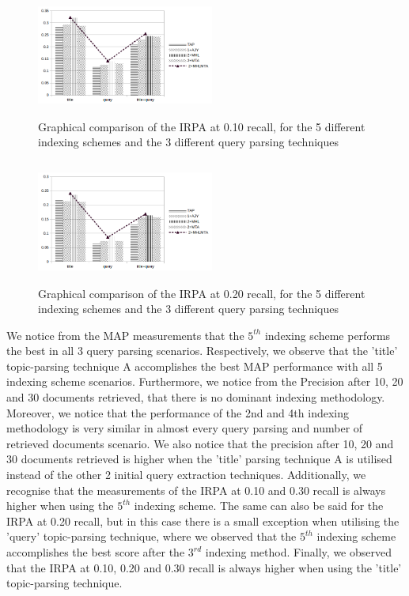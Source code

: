 \vspace{-0.5cm}
\begin{figure}[H]
    \centering 
  \includegraphics[height=4.05cm,width=0.520\textwidth]{interpolated_R_P_at_10.png}
  \vspace{-0.75cm}
    \caption{Graphical comparison of the IRPA at 0.10 recall, for the 5 different indexing schemes and the 3 different query parsing techniques}
    \label{fig:irp_at_10}
\end{figure}
\vspace{-0.5cm}
\begin{figure}[H]
    \centering 
  \includegraphics[height=4.05cm,width=0.520\textwidth]{interpolated_R_P_at_20.png}
  \vspace{-0.75cm}
    \caption{Graphical comparison of the IRPA at 0.20 recall, for the 5 different indexing schemes and the 3 different query parsing techniques}
    \label{fig:irp_at_20}
\end{figure}
\vspace{-0.3cm}
We notice from the MAP measurements that the $5^{th}$ indexing scheme performs the best in all 3 query parsing scenarios. Respectively, we observe that the 'title' topic-parsing technique A accomplishes the best MAP performance with all 5 indexing scheme scenarios. Furthermore, we notice from the Precision after 10, 20 and 30 documents retrieved, that there is no dominant indexing methodology. Moreover, we notice that the performance of the 2nd and 4th indexing methodology is very similar in almost every query parsing and number of retrieved documents scenario. We also notice that the precision after 10, 20 and 30  documents retrieved is higher when the 'title' parsing technique A is utilised instead of the other 2 initial query extraction techniques. Additionally, we recognise that the measurements of the IRPA at 0.10 and 0.30 recall is always higher when using the $5^{th}$ indexing scheme. The same can also be said for the IRPA at 0.20 recall, but in this case there is a small exception when utilising the 'query' topic-parsing technique, where we observed that the $5^{th}$ indexing scheme accomplishes the best score after the $3^{rd}$ indexing method. Finally, we observed that the IRPA at 0.10, 0.20 and 0.30 recall is always higher when using the 'title' topic-parsing technique.  

